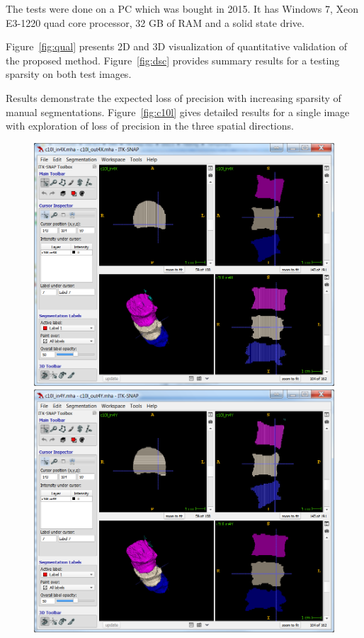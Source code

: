 \documentclass{InsightArticle}
\begin{document}
The tests were done on a PC which was bought in 2015. It has Windows 7,
Xeon E3-1220 quad core processor, 32 GB of RAM and a solid state drive.

Figure~\ref{fig:qual} presents 2D and 3D visualization
of quantitative validation of the proposed method.
Figure~\ref{fig:dsc} provides summary results for a testing sparsity on both test images.

Results demonstrate the expected loss of precision
with increasing sparsity of manual segmentations.
Figure~\ref{fig:c10l} gives detailed results for a single image with exploration
of loss of precision in the three spatial directions.

\begin{figure}[htbp]
\center
\includegraphics[scale=0.42]{c10x.png}
\includegraphics[scale=0.42]{c10y.png}

\end{figure}
\end{document}
